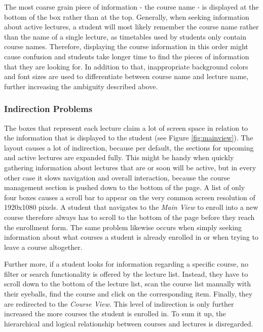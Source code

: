 The most coarse grain piece of information - the course name - is displayed at the bottom of the box rather than at the top. Generally, when seeking information about active lectures, a student will most likely remember the course name rather than the name of a single lecture, as timetables used by students only contain course names. Therefore, displaying the course information in this order might cause confusion and students take longer time to find the pieces of information that they are looking for.
In addition to that, inappropriate background colors and font sizes are used to differentiate between course name and lecture name, further increasing the ambiguity described above.

\subsubsection{Indirection Problems}

The boxes that represent each lecture claim a lot of screen space in relation to the information that is displayed to the student (see Figure \ref{fig:mainview}). The layout causes a lot of indirection, because per default, the sections for upcoming and active lectures are expanded fully. This might be handy when quickly gathering information about lectures that are or soon will be active, but in every other case it slows navigation and overall interaction, because the course management section is pushed down to the bottom of the page.
A list of only four boxes causes a scroll bar to appear on the very common screen resolution of 1920x1080 pixels. A student that navigates to the \emph{Main View} to enroll into a new course therefore always has to scroll to the bottom of the page before they reach the enrollment form. The same problem likewise occurs when simply seeking information about what courses a student is already enrolled in or when trying to leave a course altogether. 

Further more, if a student looks for information regarding a specific course, no filter or search functionality is offered by the lecture list. Instead, they have to scroll down to the bottom of the lecture list, scan the course list manually with their eyeballs, find the course and click on the corresponding item. Finally, they are redirected to the \emph{Course View}. This level of indirection is only further increased the more courses the student is enrolled in. 
To sum it up, the hierarchical and logical relationship between courses and lectures is disregarded. 

